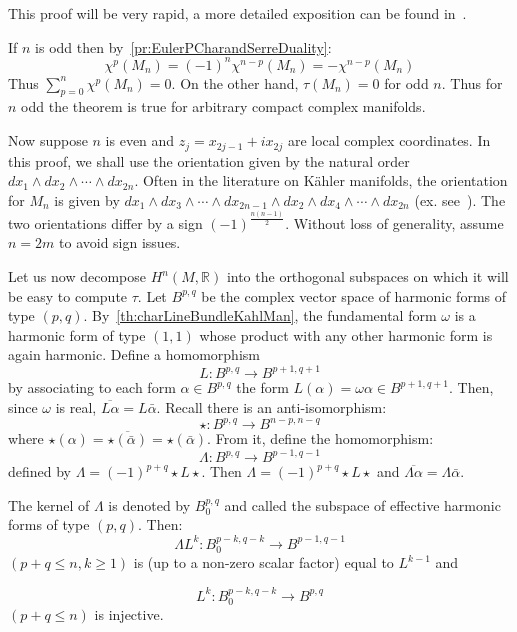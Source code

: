 \documentclass{ut-thesis}
\newenvironment{Proof}[1][]
  {\begin{ProofTcb}[#1]}
  {\end{ProofTcb}}
\newcommand{\R}{{\mathbb{R}}}
\begin{document}
\begin{Proof}
  This proof will be very rapid, a more detailed exposition can be found
  in~\cite[theorem~15.8.2]{hirzebruchTopologicalMethodsAlgebraic1995}.

  If $n$ is odd then
  by~\cref{pr:EulerPCharandSerreDuality}:
  \[
      \chi^p(M_n) = (-1)^n \chi^{n-p}(M_n) = -\chi^{n-p}(M_n)
  \]
  Thus $\sum_{p=0}^n \chi^p(M_n) = 0$. On the other hand, $\tau(M_n) = 0$ for odd $n$. Thus for $n$ odd the theorem is true for arbitrary compact complex manifolds.

  Now suppose $n$ is even and $z_j = x_{2j-1} + i x_{2j}$ are local complex coordinates. In this proof, we
  shall use the orientation
  given by the natural order $dx_1 \wedge dx_2 \wedge \cdots \wedge dx_{2n}$. Often in the literature on K\"ahler
  manifolds, the orientation for $M_n$ is given by $dx_1 \wedge dx_3 \wedge \cdots \wedge dx_{2n-1} \wedge dx_2
  \wedge dx_4 \wedge \cdots \wedge dx_{2n}$ (ex. see~\cite{hodge1951kahler}). The two orientations differ by a
  sign $(-1)^{\frac{n(n-1)}{2}}$. Without loss of generality, assume $n = 2m$ to avoid sign issues.

  Let us now decompose $H^n(M, \R)$ into the orthogonal subspaces on which it will be easy to compute $\tau$.
  Let $B^{p,q}$ be the complex vector space of harmonic forms of type $(p,q)$.
  By~\cref{th:charLineBundleKahlMan}, the fundamental form $\omega$ is a harmonic form of type $(1,1)$ whose
  product with any other harmonic form is again harmonic. Define a homomorphism
  \[
      L: B^{p,q} \to B^{p+1,q+1}
  \]
  by associating to each form $\alpha \in B^{p,q}$ the form $L(\alpha) = \omega \alpha \in B^{p+1,q+1}$. Then,
  since $\omega$ is real, $\overline{L\alpha} = L\bar{\alpha}$. Recall there is an anti-isomorphism:
  \[
      \star: B^{p,q} \to B^{n-p,n-q}
  \]
  where $\star(\alpha) = \overline{\star(\bar{\alpha})} = \star(\bar{\alpha})$. From it, define the
  homomorphism:
  \[
      \Lambda: B^{p,q} \to B^{p-1,q-1}
  \]
  defined by $\Lambda = (-1)^{p+q}\star L\star$. Then $\Lambda = (-1)^{p+q}\star L\star$ and $\overline{\Lambda\alpha} = \Lambda\bar{\alpha}$.

  The kernel of $\Lambda$ is denoted by $B_0^{p,q}$ and called the subspace of effective harmonic forms of
  type $(p,q)$. Then:
  \[
    \Lambda L^k: B_0^{p-k,q-k} \to B^{p-1,q-1}
  \]
  $(p+q \leq n, k \geq 1)$ is (up to a non-zero scalar factor) equal to $L^{k-1}$ and

  \[
    L^k: B_0^{p-k,q-k} \to B^{p,q}
  \]
  $(p+q \leq n)$ is injective.


\end{Proof}
\end{document}

